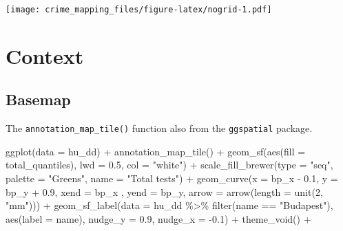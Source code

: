 \documentclass[
]{book}
\newenvironment{Shaded}{\begin{snugshade}}{\end{snugshade}}
\newcommand{\AttributeTok}[1]{\textcolor[rgb]{0.77,0.63,0.00}{#1}}
\newcommand{\DecValTok}[1]{\textcolor[rgb]{0.00,0.00,0.81}{#1}}
\newcommand{\FloatTok}[1]{\textcolor[rgb]{0.00,0.00,0.81}{#1}}
\newcommand{\FunctionTok}[1]{\textcolor[rgb]{0.00,0.00,0.00}{#1}}
\newcommand{\NormalTok}[1]{#1}
\newcommand{\SpecialCharTok}[1]{\textcolor[rgb]{0.00,0.00,0.00}{#1}}
\newcommand{\StringTok}[1]{\textcolor[rgb]{0.31,0.60,0.02}{#1}}
\begin{document}
\texttt{[image: crime\_mapping\_files/figure-latex/nogrid-1.pdf]}

\hypertarget{context}{%
\section{Context}\label{context}}

\hypertarget{basemap}{%
\subsection{Basemap}\label{basemap}}

The \texttt{annotation\_map\_tile()} function also from the \texttt{ggspatial} package.

\begin{Shaded}
\begin{Highlighting}[]
\FunctionTok{ggplot}\NormalTok{(}\AttributeTok{data =}\NormalTok{ hu\_dd) }\SpecialCharTok{+} 
  \FunctionTok{annotation\_map\_tile}\NormalTok{() }\SpecialCharTok{+} 
  \FunctionTok{geom\_sf}\NormalTok{(}\FunctionTok{aes}\NormalTok{(}\AttributeTok{fill =}\NormalTok{ total\_quantiles), }\AttributeTok{lwd =} \FloatTok{0.5}\NormalTok{, }\AttributeTok{col =} \StringTok{"white"}\NormalTok{) }\SpecialCharTok{+} 
  \FunctionTok{scale\_fill\_brewer}\NormalTok{(}\AttributeTok{type =} \StringTok{"seq"}\NormalTok{, }\AttributeTok{palette =} \StringTok{"Greens"}\NormalTok{, }\AttributeTok{name =} \StringTok{"Total tests"}\NormalTok{) }\SpecialCharTok{+} 
  \FunctionTok{geom\_curve}\NormalTok{(}\AttributeTok{x =}\NormalTok{ bp\_x }\SpecialCharTok{{-}} \FloatTok{0.1}\NormalTok{, }
             \AttributeTok{y =}\NormalTok{ bp\_y }\SpecialCharTok{+} \FloatTok{0.9}\NormalTok{, }
             \AttributeTok{xend =}\NormalTok{ bp\_x , }
             \AttributeTok{yend =}\NormalTok{ bp\_y, }
             \AttributeTok{arrow =} \FunctionTok{arrow}\NormalTok{(}\AttributeTok{length =} \FunctionTok{unit}\NormalTok{(}\DecValTok{2}\NormalTok{, }\StringTok{"mm"}\NormalTok{))) }\SpecialCharTok{+}
  \FunctionTok{geom\_sf\_label}\NormalTok{(}\AttributeTok{data =}\NormalTok{ hu\_dd }\SpecialCharTok{\%\textgreater{}\%} \FunctionTok{filter}\NormalTok{(name }\SpecialCharTok{==} \StringTok{"Budapest"}\NormalTok{), }
                \FunctionTok{aes}\NormalTok{(}\AttributeTok{label =}\NormalTok{ name), }
                \AttributeTok{nudge\_y =} \FloatTok{0.9}\NormalTok{, }
                \AttributeTok{nudge\_x =} \SpecialCharTok{{-}}\FloatTok{0.1}\NormalTok{) }\SpecialCharTok{+} 
  \FunctionTok{theme\_void}\NormalTok{() }\SpecialCharTok{+} 

\end{Highlighting}
\end{Shaded}
\end{document}
